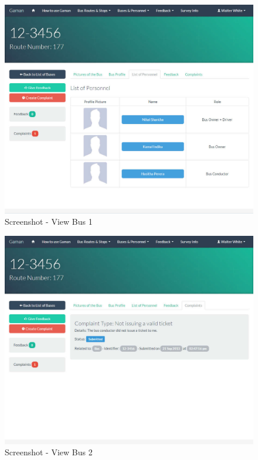 \begin {figure} [h!]
\centering
\includegraphics[scale=0.2]{viewBus1}
\caption [Screenshot - View Bus 1] {Screenshot - View Bus 1}
\label {image-viewBus1}
\end {figure}

\begin {figure} [h!]
\centering
\includegraphics[scale=0.2]{viewBus2}
\caption [Screenshot - View Bus 2] {Screenshot - View Bus 2}
\label {image-viewBus2}
\end {figure}


